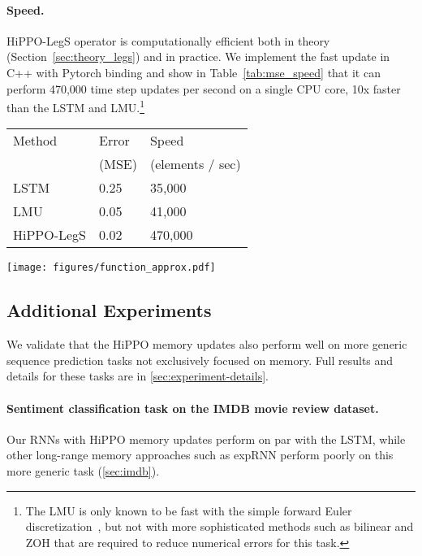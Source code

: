 \documentclass{article}
\begin{document}
\paragraph{Speed.}
HiPPO-LegS operator is computationally efficient both in theory
(Section~\ref{sec:theory_legs}) and in practice.
We implement the fast update in C++ with Pytorch binding and show in
Table~\ref{tab:mse_speed} that it can perform 470,000 time step updates per second on a single CPU
core, 10x faster than the LSTM and LMU.\footnote{The LMU is only known to be fast with the simple forward Euler
discretization~\citep{voelker2019legendre}, but not with more sophisticated methods such as bilinear and
ZOH that are required to reduce numerical errors for this task.}

\begin{minipage}{.4\linewidth}
  \small
  \centering
  \begin{tabular}{lll}
      \toprule
      Method     & Error  & Speed  \\
      & (MSE) & (elements / sec) \\
      \midrule
      LSTM       & 0.25 & 35,000             \\
      LMU        & 0.05 & 41,000             \\
      HiPPO-LegS & 0.02 & 470,000            \\
      \bottomrule
  \end{tabular}
  \label{tab:mse_speed}
\end{minipage}\hfill
\begin{minipage}{.6\linewidth}\centering
  \texttt{[image: figures/function\_approx.pdf]}
  \label{fig:function_approx}
\end{minipage}

\subsection{Additional Experiments}
\label{subsec:sequencetasks}

We validate that the HiPPO memory updates also perform well on more generic
sequence prediction tasks not exclusively focused on memory.
Full results and details for these tasks are in \cref{sec:experiment-details}.

\paragraph{Sentiment classification task on the IMDB movie review dataset.}
Our RNNs with HiPPO memory updates
perform on par with the LSTM, while other 
long-range memory approaches such as expRNN perform poorly on this more generic task
(\cref{sec:imdb}).
\end{document}
